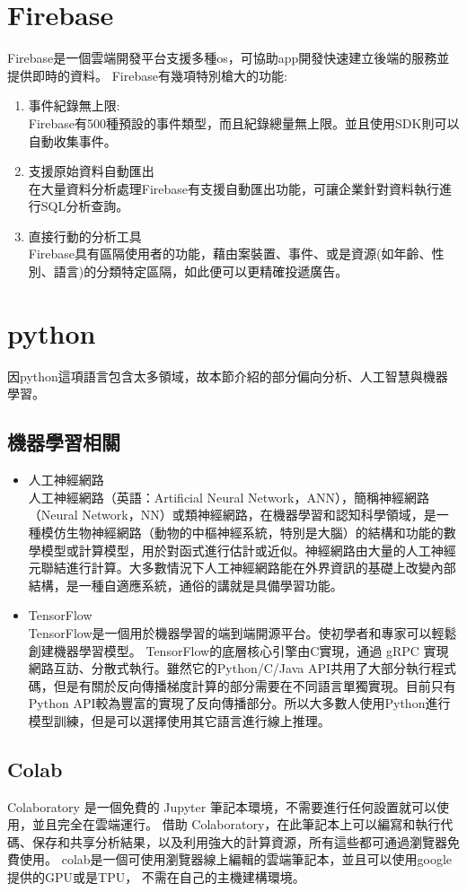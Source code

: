 \section{Firebase}
Firebase是一個雲端開發平台支援多種os，可協助app開發快速建立後端的服務並提供即時的資料。\cite{name23}
Firebase有幾項特別槍大的功能:
\begin{enumerate}[1.]
	\item 事件紀錄無上限:\\
	Firebase有500種預設的事件類型，而且紀錄總量無上限。並且使用SDK則可以自動收集事件。
	\item 支援原始資料自動匯出\\
	在大量資料分析處理Firebase有支援自動匯出功能，可讓企業針對資料執行進行SQL分析查詢。
	\item 直接行動的分析工具\\
	Firebase具有區隔使用者的功能，藉由案裝置、事件、或是資源(如年齡、性別、語言)的分類特定區隔，如此便可以更精確投遞廣告。\cite{name22}
	
	
	\end{enumerate}

\section{python}
因python這項語言包含太多領域，故本節介紹的部分偏向分析、人工智慧與機器學習。
\subsection{機器學習相關}
\begin{itemize}
	\item 人工神經網路\\
	人工神經網路（英語：Artificial Neural Network，ANN），簡稱神經網路（Neural Network，NN）或類神經網路，在機器學習和認知科學領域，是一種模仿生物神經網路（動物的中樞神經系統，特別是大腦）的結構和功能的數學模型或計算模型，用於對函式進行估計或近似。神經網路由大量的人工神經元聯結進行計算。大多數情況下人工神經網路能在外界資訊的基礎上改變內部結構，是一種自適應系統，通俗的講就是具備學習功能。\cite{name16}
	\item TensorFlow\\
	TensorFlow是一個用於機器學習的端到端開源平台。使初學者和專家可以輕鬆創建機器學習模型。\cite{name17}
	TensorFlow的底層核心引擎由C實現，通過 gRPC 實現網路互訪、分散式執行。雖然它的Python/C/Java API共用了大部分執行程式碼，但是有關於反向傳播梯度計算的部分需要在不同語言單獨實現。目前只有Python API較為豐富的實現了反向傳播部分。所以大多數人使用Python進行模型訓練，但是可以選擇使用其它語言進行線上推理。 \cite{name18}
	
\end{itemize}
\subsection{Colab}
Colaboratory 是一個免費的 Jupyter 筆記本環境，不需要進行任何設置就可以使用，並且完全在雲端運行。
借助 Colaboratory，在此筆記本上可以編寫和執行代碼、保存和共享分析結果，以及利用強大的計算資源，所有這些都可通過瀏覽器免費使用。\cite{name19}
colab是一個可使用瀏覽器線上編輯的雲端筆記本，並且可以使用google提供的GPU或是TPU，
不需在自己的主機建構環境。
